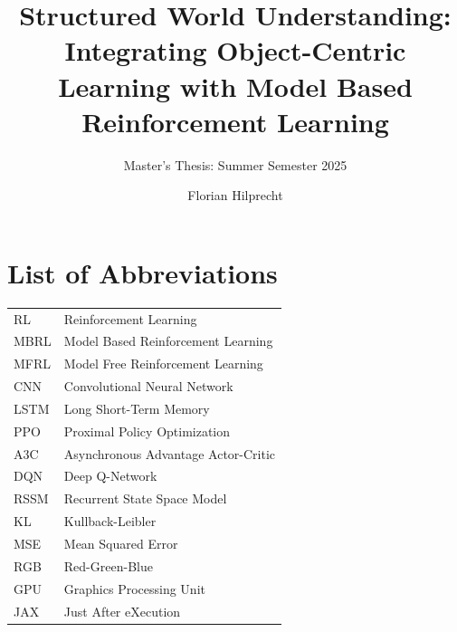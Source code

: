 \documentclass[
	english,
	ruledheaders=section,
	class=report,
	thesis={type=master},
	accentcolor=9c,
	custommargins=true,
	marginpar=false,
	parskip=half-,
	fontsize=11pt,
	pdfa=true,
]{tudapub}
\begin{document}

\title{Structured World Understanding: Integrating Object-Centric Learning with Model Based Reinforcement Learning}
\subtitle{Master's Thesis: Summer Semester 2025}
\author[Florian Hilprecht]{Florian Hilprecht}



\maketitle



\tableofcontents
\listoffigures
\listoftables

\chapter*{List of Abbreviations}
\begin{tabular}{ll}
	RL   & Reinforcement Learning              \\
	MBRL & Model Based Reinforcement Learning  \\
	MFRL & Model Free Reinforcement Learning   \\
	CNN  & Convolutional Neural Network        \\
	LSTM & Long Short-Term Memory              \\
	PPO  & Proximal Policy Optimization        \\
	A3C  & Asynchronous Advantage Actor-Critic \\
	DQN  & Deep Q-Network                      \\
	RSSM & Recurrent State Space Model         \\
	KL   & Kullback-Leibler                    \\
	MSE  & Mean Squared Error                  \\
	RGB  & Red-Green-Blue                      \\
	GPU  & Graphics Processing Unit            \\
	JAX  & Just After eXecution                \\
\end{tabular}
\end{document}
